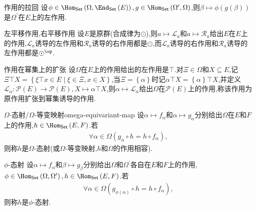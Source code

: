 \begin{example}{作用的拉回}{}
	设$\phi\in\Hom_{\mathsf{Set}}\left(\Omega,\End_{\mathsf{Set}}\left(E\right)\right),g\in\Hom_{\mathsf{Set}}\left(\Omega^{\prime},\Omega\right)$,则$\beta\mapsto\phi\left(g\left(\beta\right)\right)$是$\Omega^{\prime}$在$E$上的左作用.
\end{example}

\begin{example}{左平移作用,右平移作用}{}
	设$E$是原群(合成律为$\odot$),则$a\mapsto\mathcal{L}_{a}$和$a\mapsto\mathcal{R}_{a}$给出$E$在$E$上的作用,$\mathcal{L}_{a}$诱导的左作用和$\mathcal{R}_{a}$诱导的右作用都是$\odot$,而$\mathcal{L}_{a}$诱导的右作用和$\mathcal{R}_{a}$诱导的左作用都是$\odot^{\op}$.
\end{example}

\begin{example}{作用在幂集上的扩张}{}
	设$\Omega$在$E$上的作用给出的左作用是$\top$.对$\Xi\in\Omega$和$X\subseteq E$,记$\Xi\top X=\left\{\xi\top x\in E\middle|\xi\in\Xi,x\in X\right\}$,当$\Xi=\left\{\alpha\right\}$时记$\alpha\top X=\left\{\alpha\right\}\top X$,并定义$\mathcal{L}_{\alpha}:\mathcal{P}\left(E\right)\to\mathcal{P}\left(E\right),X\mapsto \alpha\top X$,则$\alpha\mapsto\mathcal{L}_{\alpha}$给出$\Omega$在$\mathcal{P}\left(E\right)$上的作用,称该作用为原作用扩张到幂集诱导的作用.
\end{example}

\begin{definition}{$\Omega$-态射/$\Omega$-等变映射}{omega-equivariant-map}
	设$\alpha\mapsto f_{\alpha}$和$\alpha\mapsto g_{\alpha}$分别给出$\Omega$在$E$和$F$上的作用,$h\in\Hom_{\mathsf{Set}}\left(E,F\right)$.若
	\begin{align*}
		\forall\alpha\in\Omega\left(g_{\alpha}\circ h=h\circ f_{\alpha}\right),
	\end{align*}
	则称$h$是$\Omega$-态射(或$\Omega$-等变映射,$h$和$\Omega$的作用相容).
\end{definition}

\begin{definition}{$\phi$-态射}{}
	设$\alpha\mapsto f_{\alpha}$和$\beta\mapsto g_{\beta}$分别给出$\Omega$和$\Omega^{\prime}$各自在$E$和$F$上的作用,$\phi\in\Hom_{\mathsf{Set}}\left(\Omega,\Omega^{\prime}\right),h\in\Hom_{\mathsf{Set}}\left(E,F\right)$.若
	\begin{align*}
		\forall\alpha\in\Omega\left(g_{\phi\left(\alpha\right)}\circ h=h\circ f_{\alpha}\right),
	\end{align*}
	则称$h$是$\phi$-态射.
\end{definition}

